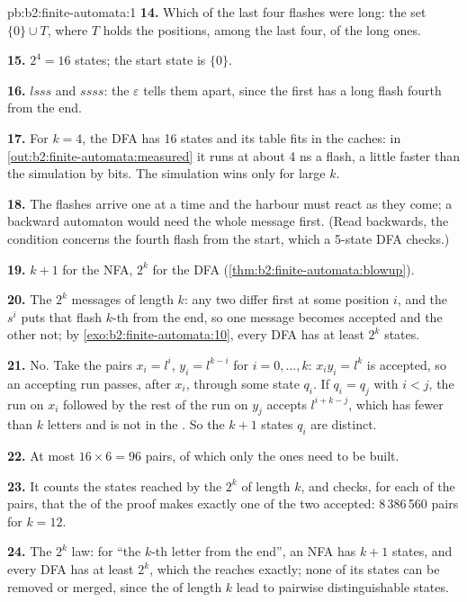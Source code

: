\begin{solution}{pb:b2:finite-automata:1}
\textbf{14.} Which of the last four flashes were long: the set $\{0\} \cup T$, where $T$ holds the positions, among
the last four, of the long ones.

\textbf{15.} $2^4 = 16$ states; the start state is $\{0\}$.

\textbf{16.} $lsss$ and $ssss$: the  $\varepsilon$ tells them apart, since the first has a long flash fourth
from the end.

\textbf{17.} For $k = 4$, the DFA has 16 states and its table fits in the caches: in
\cref{out:b2:finite-automata:measured} it runs at about 4 ns a flash, a little faster than the simulation by bits.
The simulation wins only for large $k$.

\textbf{18.} The flashes arrive one at a time and the harbour must react as they come; a backward automaton would
need the whole message first. (Read backwards, the condition concerns the fourth flash from the start, which a
5-state DFA checks.)

\textbf{19.} $k + 1$ for the NFA, $2^k$ for the DFA (\cref{thm:b2:finite-automata:blowup}).

\textbf{20.} The $2^k$ messages of length $k$: any two differ first at some position $i$, and the  $s^i$ puts
that flash $k$-th from the end, so one message becomes accepted and the other not; by
\cref{exo:b2:finite-automata:10}, every DFA has at least $2^k$ states.

\textbf{21.} No. Take the pairs $x_i = l^i$, $y_i = l^{k-i}$ for $i = 0, \dots, k$: $x_i y_i = l^k$ is accepted, so an
accepting run passes, after $x_i$, through some state $q_i$. If $q_i = q_j$ with $i < j$, the run on $x_i$ followed by
the rest of the run on $y_j$ accepts $l^{i + k - j}$, which has fewer than $k$ letters and is not in the . So
the $k + 1$ states $q_i$ are distinct.

\textbf{22.} At most $16 \times 6 = 96$ pairs, of which only the  ones need to be built.

\textbf{23.} It counts the states reached by the $2^k$  of length $k$, and checks, for each of the pairs, that
the  of the proof makes exactly one of the two  accepted: 8\,386\,560 pairs for $k = 12$.

\textbf{24.} The $2^k$ law: for ``the $k$-th letter from the end'', an NFA has $k + 1$ states, and every DFA has at
least $2^k$, which the  reaches exactly; none of its states can be removed or merged, since the
 of length $k$ lead to pairwise distinguishable states.
\end{solution}
